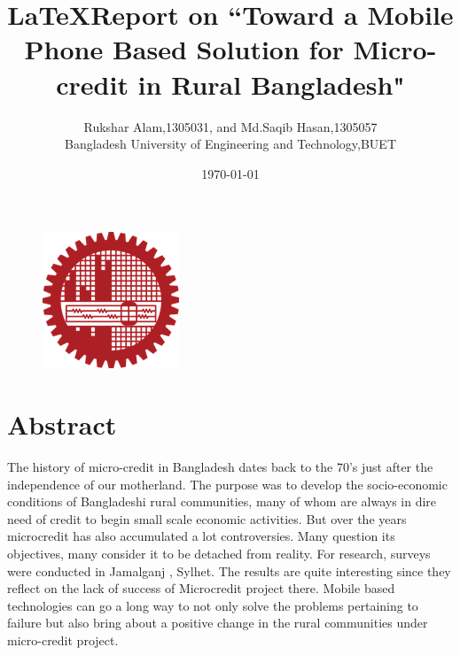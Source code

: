 \documentclass{report}
\begin{document}
\title{\LaTeX  Report on \textbf{``Toward a Mobile Phone Based Solution for Micro-credit in Rural Bangladesh"}}
\author{Rukshar Alam,1305031, and Md.Saqib Hasan,1305057\\
Bangladesh University of Engineering and Technology,BUET}
\date{\today}
\begin{figure}
\begin{center}
\includegraphics[scale=1]{buetlogo2.png}
\end{center}
\end{figure}
\maketitle
\newpage

\tableofcontents
\newpage

\chapter{Abstract}
The history of micro-credit in Bangladesh dates back to the 70’s just after the independence of our motherland. The purpose was to develop the socio-economic conditions of Bangladeshi rural communities, many of whom are always in dire need of credit to begin small scale economic activities.
But over the years microcredit has also accumulated a lot controversies\cite{1}. Many question its objectives, many consider it to be detached from reality. For research, surveys were conducted in Jamalganj , Sylhet. The results are quite interesting since they reflect  on the lack of success of Microcredit  project there. Mobile based technologies can go a long way to not only solve the problems pertaining to failure but also bring about a positive change in the rural communities under micro-credit project.
\newpage
\end{document}
